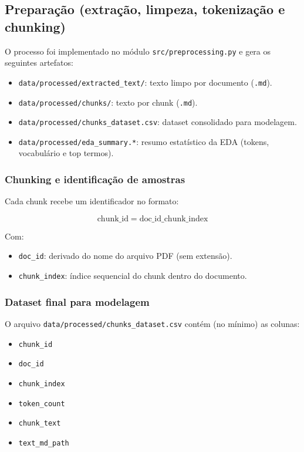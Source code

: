 \subsection{Preparação (extração, limpeza, tokenização e chunking)}

O processo foi implementado no módulo \texttt{src/preprocessing.py} e gera os seguintes artefatos:

\begin{itemize}[leftmargin=1.2cm]
    \item \texttt{data/processed/extracted\_text/}: texto limpo por documento (\texttt{.md}).
    \item \texttt{data/processed/chunks/}: texto por chunk (\texttt{.md}).
    \item \texttt{data/processed/chunks\_dataset.csv}: dataset consolidado para modelagem.
    \item \texttt{data/processed/eda\_summary.*}: resumo estatístico da EDA (tokens, vocabulário e top termos).
\end{itemize}

\subsubsection{Chunking e identificação de amostras}

Cada chunk recebe um identificador no formato:

\[
 \text{chunk\_id} = \text{doc\_id}\_\text{chunk\_index}
 \]

Com:
\begin{itemize}[leftmargin=1.2cm]
    \item \texttt{doc\_id}: derivado do nome do arquivo PDF (sem extensão).
    \item \texttt{chunk\_index}: índice sequencial do chunk dentro do documento.
\end{itemize}

\subsubsection{Dataset final para modelagem}

O arquivo \texttt{data/processed/chunks\_dataset.csv} contém (no mínimo) as colunas:

\begin{itemize}[leftmargin=1.2cm]
    \item \texttt{chunk\_id}
    \item \texttt{doc\_id}
    \item \texttt{chunk\_index}
    \item \texttt{token\_count}
    \item \texttt{chunk\_text}
    \item \texttt{text\_md\_path}
\end{itemize}

